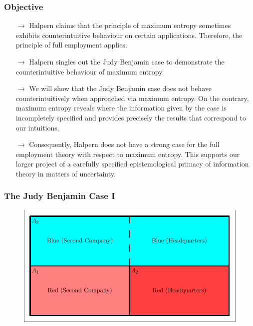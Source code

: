\documentclass[xcolor=dvipsnames]{beamer}
\begin{document}
\begin{frame}
  \frametitle{Objective}
\begin{itemize}
\item[$\rightarrow$] Halpern claims that the principle of maximum entropy
  sometimes exhibits counterintuitive behaviour on certain
  applications. Therefore, the principle of full employment
  applies.
\item[$\rightarrow$] Halpern singles out the Judy Benjamin case to demonstrate
  the counterintuitive behaviour of maximum entropy.
\item[$\rightarrow$] We will show that the Judy Benjamin case does not behave
  counterintuitively when approached via maximum entropy. On the
  contrary, maximum entropy reveals where the information given by
  the case is incompletely specified and provides precisely the
  results that correspond to our intuitions.
\item[$\rightarrow$] Consequently, Halpern does not have a strong case for the
  full employment theory with respect to maximum entropy. This
  supports our larger project of a carefully specified
  epistemological primacy of information theory in matters of
  uncertainty.
\end{itemize}
\end{frame}

\begin{frame}
  \frametitle{The Judy Benjamin Case I}
\begin{figure}[h]
\includegraphics[scale=.5]{judy.pdf}
\end{figure}
\end{frame}
\end{document}
